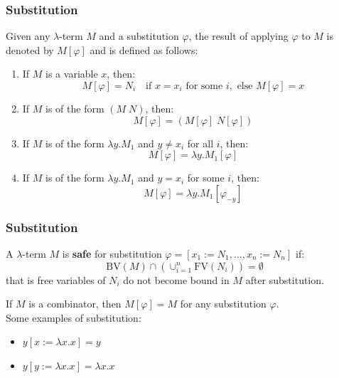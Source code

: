 \documentclass{beamer}
\begin{document}
\begin{frame}
  \frametitle{Substitution}
  
  Given any $\lambda$-term \(M\) and a substitution \(\varphi\), the result of applying \(\varphi\) to \(M\) is denoted by \(M[\varphi]\) and is defined as follows:
  \begin{enumerate}
      \item If \(M\) is a variable \(x\), then:
        \[
        M[\varphi] = N_i \quad \text{if } x = x_i \text{ for some } i, \text{ else } M[\varphi] = x
        \]
    \item If \(M\) is of the form \((M \; N)\), then:
      \[
      M[\varphi] = (M[\varphi] \; N[\varphi])
      \]
    \item If \(M\) is of the form \(\lambda y.M_1\) and \(y \neq x_i\) for all \(i\), then:
      \[
      M[\varphi] = \lambda y.M_1[\varphi]
      \]
    \item If \(M\) is of the form \(\lambda y.M_1\) and \(y = x_i\) for some \(i\), then:
      \[
      M[\varphi] = \lambda y.M_1[\varphi_{-y}]
      \]
  \end{enumerate}

\end{frame}

\begin{frame}
  \frametitle{Substitution}

  A \(\lambda\)-term \(M\) is \textbf{safe} for substitution \(\varphi = [x_1 := N_1, \ldots, x_n := N_n]\) if:
  \[
    \text{BV}(M) \cap (\cup_{i=1}^n \text{FV}(N_i)) = \emptyset
  \] 
  that is free variables of \(N_i\) do not become bound in \(M\) after substitution.\\
  \vspace{1em}

  If \(M\) is a combinator, then \(M[\varphi] = M\) for any substitution \(\varphi\).\\

  Some examples of substitution:
  \begin{itemize}
    \item \(y[x:=\lambda x.x] = y\) 
    \item \(y[y:=\lambda x.x] = \lambda x.x\)
  \end{itemize}
\end{frame}



\end{document}
